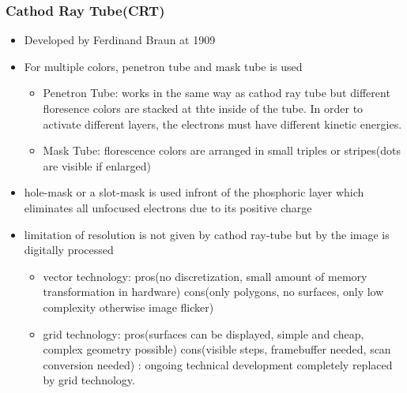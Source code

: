 \documentclass{standalone}
\begin{document}
\subsubsection*{Cathod Ray Tube(CRT)}
\begin{itemize}
\item Developed by Ferdinand Braun at 1909
\item For multiple colors, penetron tube and mask tube is used
\begin{itemize}
\item Penetron Tube: works in the same way as cathod ray tube but different floresence colors are stacked at thte inside of the tube. In order to activate different layers, the electrons must have different kinetic energies.
\item Mask Tube: florescence colors are arranged in small triples or stripes(dots are visible if enlarged)
\end{itemize}
\item hole-mask or a slot-mask is used infront of the phosphoric layer which eliminates all unfocused electrons due to its positive charge
\item limitation of resolution is not given by cathod ray-tube but by the image is digitally processed
\begin{itemize}
\item vector technology: pros(no discretization, small amount of memory transformation in hardware) cons(only polygons, no surfaces, only low complexity otherwise image flicker)
\item grid technology: pros(surfaces can be displayed, simple and cheap, complex geometry possible) cons(visible steps, framebuffer needed, scan conversion needed) : ongoing technical development completely replaced by grid technology.
\end{itemize}
\end{itemize}
\end{document}
